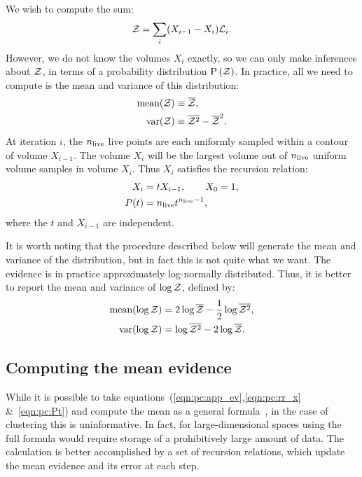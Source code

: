 We wish to compute the sum:
%
\begin{equation}
  \mathcal{Z} = \sum\limits_{i} (X_{i-1}-X_{i})\mathcal{L}_i.
  \label{eqn:pc:app_ev}
\end{equation}
%
However, we do not know the volumes $X_i$ exactly, so we can only make inferences about $\mathcal{Z}$, in terms of a probability distribution $\mathrm{P}\left(\mathcal{Z}\right)$. In practice, all we need to compute is the mean and variance of this distribution:
\begin{align}
  \text{mean}(\mathcal{Z}) &\equiv \overline{\mathcal{Z}},\\
  \text{var}(\mathcal{Z}) &\equiv \overline{\mathcal{Z}^2}-\overline{\mathcal{Z}}^2.
\end{align}
%
At iteration $i$, the $n_{\mathrm{live}}$ live points are each uniformly sampled within a contour of volume $X_{i-1}$. The volume $X_i$ will be the largest volume out of $n_{\mathrm{live}}$ uniform volume samples in volume $X_i$.
Thus $X_i$ satisfies the recursion relation:
%
\begin{align}
  X_i &= t X_{i-1}, \qquad X_0=1, \label{eqn:pc:rr_x} \\
  P(t) &= n_{\mathrm{live}} t^{n_{\mathrm{live}} - 1}, \label{eqn:pc:Pt}
\end{align}
%
where the $t$ and $X_{i-1}$ are independent.

It is worth noting that the procedure described below will generate the mean and variance of the distribution, but in fact this is not quite what we want. The evidence is in practice approximately log-normally distributed. Thus, it is better to report the mean and variance of $\log\mathcal{Z}$, defined by:
\begin{align}
  \text{mean}(\log\mathcal{Z}) &= 2\log\overline{\mathcal{Z}} - \frac{1}{2}\log\overline{\mathcal{Z}^2},\\
  \text{var}(\log\mathcal{Z}) &= \log\overline{\mathcal{Z}^2}-2\log\overline{\mathcal{Z}}.
\end{align}


\subsection{Computing the mean evidence}
\label{sec:pc:basic_mean}

While it is possible to take equations~(\ref{eqn:pc:app_ev},\ref{eqn:pc:rr_x} \&~\ref{eqn:pc:Pt}) and compute the mean as a general formula~\citep{Keeton}, in the case of clustering this is uninformative. 
In fact, for large-dimensional spaces using the full formula would require storage of a prohibitively large amount of data. The calculation is better accomplished by a set of recursion relations, which update the mean evidence and its error at each step. 

